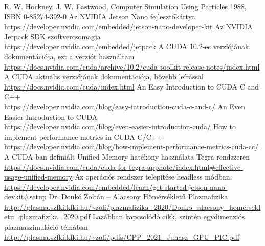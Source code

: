 \documentclass[a4paper,12pt,titlepage]{article}
\begin{document}
	\begin{thebibliography}{12}
		 R. W. Hockney, J. W. Eastwood, Computer Simulation Using Particles 1988, ISBN 0-85274-392-0
		 Az NVIDIA Jetson Nano fejlesztőkártya \\ \url{https://developer.nvidia.com/embedded/jetson-nano-developer-kit}
		 Az NVIDIA Jetpack SDK szoftvercsomagja \\ \url{https://developer.nvidia.com/embedded/jetpack}
		 A CUDA 10.2-es verziójának dokumentációja, ezt a verziót használtam \\ \url{https://docs.nvidia.com/cuda/archive/10.2/cuda-toolkit-release-notes/index.html}
		 A CUDA aktuális verziójának dokumentációja, bővebb leírással \\ \url{https://docs.nvidia.com/cuda/index.html}
		 An Easy Introduction to CUDA C and C++ \\ \url{https://developer.nvidia.com/blog/easy-introduction-cuda-c-and-c/}
		 An Even Easier Introduction to CUDA \\ \url{https://developer.nvidia.com/blog/even-easier-introduction-cuda/}
		 How to implement performance metrics in CUDA C/C++ \\ \url{https://developer.nvidia.com/blog/how-implement-performance-metrics-cuda-cc/}
		 A CUDA-ban definiált Unified Memory hatékony használata Tegra rendszeren \\ \url{https://docs.nvidia.com/cuda/cuda-for-tegra-appnote/index.html#effective-usage-unified-memory}
		 Az operációs rendszer telepítése headless módban. \\ \url{https://developer.nvidia.com/embedded/learn/get-started-jetson-nano-devkit#setup}
		 Dr. Donkó Zoltán -- Alacsony Hőmérsékletű Plazmafizika \\ \url{http://plasma.szfki.kfki.hu/~zoli/plazmafizika_2020/Donko_alacsony_homersekletu_plazmafizika_2020.pdf}
	 Lazábban kapcsolódó cikk, szintén egydimenziós plazmaszimuláció témában \\ \url{http://plasma.szfki.kfki.hu/~zoli/pdfs/CPP_2021_Juhasz_GPU_PIC.pdf}
	\end{thebibliography}

				
\end{document}
